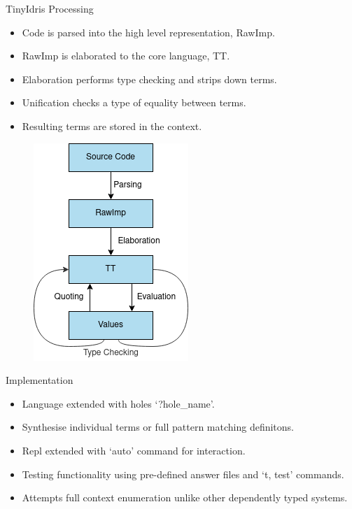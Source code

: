 \documentclass[presentation]{beamer}
\begin{document}
\begin{frame}[fragile]{TinyIdris Processing}
\begin{multicols}{2}
\begin{itemize}
    \item Code is parsed into the high level representation, RawImp.\\
    \item RawImp is elaborated to the core language, TT.\\
    \item Elaboration performs type checking and strips down terms.\\
    \item Unification checks a type of equality between terms.\\
    \item Resulting terms are stored in the context. 
\end{itemize}

\begin{figure}
\includegraphics[scale=0.6]{./Resource/main.png}
\end{figure}
\end{multicols}
\end{frame}  

\begin{frame}[fragile]{Implementation}
  \begin{itemize}
    \item Language extended with holes `?hole\_name'.
    \item Synthesise individual terms or full pattern matching definitons.
    \item Repl extended with `auto' command for interaction.
    \item Testing functionality using pre-defined answer files and `t, test' commands.
    \item Attempts full context enumeration unlike other dependently typed systems.
  \end{itemize}
\end{frame}
\end{document}
